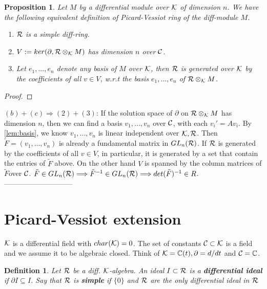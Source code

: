 \documentclass[11pt]{article}
\newtheorem{prop}[thm]{Proposition}
\newtheorem{dfn}[thm]{Definition}
\newcommand{\pd}{\partial}
\newcommand{\cplx}{\mathbb C}
\newcommand{\calc}{{\cal C}}
\newcommand{\calk}{{\cal K}}
\newcommand{\calr}{{\cal R}}
\begin{document}
\begin{prop}
Let $M$ by a differential module over  $\calk$ of dimension $n$. We have the following equivalent definition of Picard-Vessiot ring of the diff-module $M$.
\begin{enumerate}[label=(\alph*)]
\item $\calr$ is a simple diff-ring.
\item $V:=ker(\pd, \calr\otimes_{\calk} M)$ has dimension $n$ over $\calc$.
\item Let $e_1,...,e_n$ denote any basis of $M$ over $\calk$, then $\calr$ is generated over $\calk$ by the coefficients of all $v\in V$, w.r.t the basis $e_1,...,e_n$ of $\calr\otimes_\calk M$.
\end{enumerate}
\end{prop}
\begin{proof}

\end{proof}
$(b)+(c)\Longrightarrow (2)+(3)$: If the solution space of $\pd$ on $\calr\otimes_\calk M$ has dimension $n$, then we can find a basis $v_1,...,v_n$ over $\calc$, with each $v_i'=A v_i$. By \ref{lem:basis}, we know $v_1,...,v_n$ is linear independent over $\calk,\calr$. Then $\tilde{F}=(v_1,...,v_n)$ is already a fundamental matrix in $GL_n(\calr)$. If $\calr$ is generated by the coefficients of all $v\in V$, in particular, it is generated by a set that contain the entries of $\tilde{F}$ above. On the other hand $V$ is spanned by the column matrices of $\tilde{F}$over $\calc$. $\tilde{F}\in GL_n(\calr)\Longrightarrow \tilde{F}^{-1}\in GL_n(\calr)\Longrightarrow det(\tilde{F})^{-1}\in R$.
-----------------------------



\section{Picard-Vessiot extension}


$\calk$ is a differential field with $char(\calk)=0$. The set of constants $\calc\subset \calk$ is a field and we assume it to be algebraic closed. Think of $\calk=\cplx(t),\pd=d/dt$ and $\calc=\cplx$.

\begin{dfn}
Let $\calr$ be a diff. $\calk$-algebra. An ideal $I\subset \calr$ is a \textbf{differential ideal} if $\pd I\subseteq I$. Say that $\calr$ is \textbf{simple} if $\{0\}$ and $\calr$ are the only differential ideal in $\calr$
\end{dfn}
\end{document}
